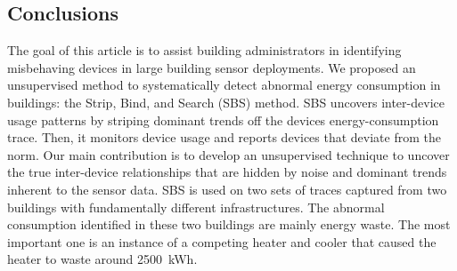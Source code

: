 \subsection{Conclusions}
The goal of this article is to assist building administrators in identifying misbehaving devices in large building sensor
deployments.  
We proposed an unsupervised method to systematically detect abnormal energy consumption in buildings: the Strip, Bind, and Search (SBS) method.
SBS uncovers inter-device usage patterns by striping dominant trends off the devices energy-consumption trace.
Then, it monitors device usage and reports devices that deviate from the norm.  
Our main contribution is to develop an unsupervised technique to uncover the true inter-device relationships that are hidden by noise and 
dominant trends inherent to the sensor data.  
SBS is used on two sets of traces captured from two buildings with fundamentally different infrastructures.
The abnormal consumption identified in these two buildings are mainly energy waste.
The most important one is an instance of a competing heater and cooler that caused the heater to waste around 2500~kWh.

